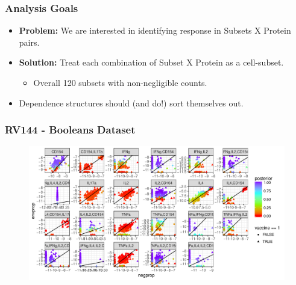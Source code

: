 \documentclass{beamer}
\makeatletter
\def\maxwidth{ %
  \ifdim\Gin@nat@width>\linewidth
    \linewidth
  \else
    \Gin@nat@width
  \fi
}
\theoremstyle{definition}
\makeatother
\begin{document}
\begin{frame}
\frametitle{Analysis Goals}
\begin{itemize}
\item \textbf{Problem:} We are interested in identifying response in Subsets X Protein pairs. 

\vspace{0.75 cm}
\item \textbf{Solution:} Treat each combination of Subset X Protein as a cell-subset.
	\begin{itemize}
	\item Overall 120 subsets with non-negligible counts. 
	\end{itemize}

\vspace{0.75 cm}
\item Dependence structures should (and do!) sort themselves out.
\end{itemize}
\end{frame}


\begin{frame}
\frametitle{RV144 - Booleans Dataset}
\begin{figure}[]
\includegraphics[width=\maxwidth]{figures/newRV144all} 
\end{figure}
\end{frame}

\end{document}
